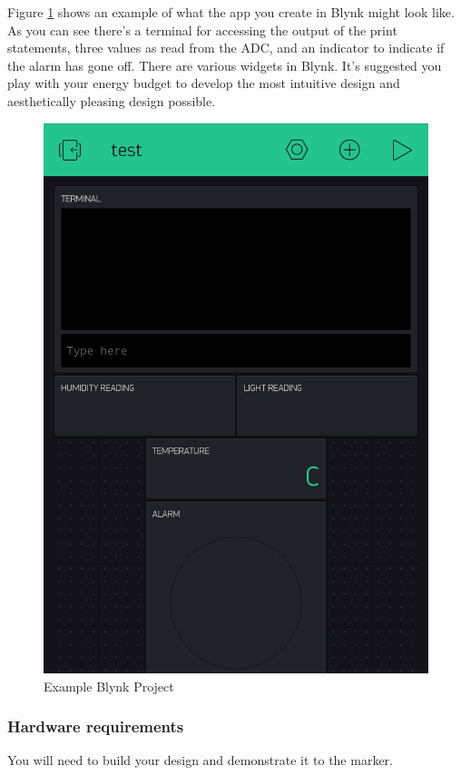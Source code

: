 \begin{multicols}{2}
Figure \ref{fig:blynkexample} shows an example of what the app you create in Blynk might look like.
As you can see there's a terminal for accessing the output of the print statements, three values as read from the ADC, and an indicator to indicate if the alarm has gone off. There are various widgets in Blynk. It's suggested you play with your energy budget to develop the most intuitive design and aesthetically pleasing design possible.
\vfill\null
\columnbreak
\begin{figure}[H]
\centering
\includegraphics[width=0.75\columnwidth]{Figures/blynkexample}
\caption{Example Blynk Project}
\label{fig:blynkexample}
\end{figure}
\end{multicols}


\subsubsection{Hardware requirements}
You will need to build your design and demonstrate it to the marker.

